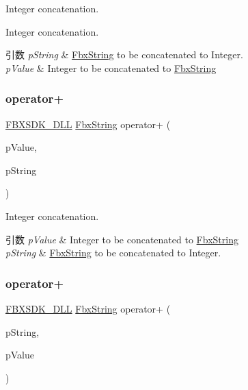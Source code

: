 Integer concatenation. 

Integer concatenation. 
\begin{DoxyParams}{引数}
{\em p\+String} & \hyperlink{class_fbx_string}{Fbx\+String} to be concatenated to Integer. \\
\hline
{\em p\+Value} & Integer to be concatenated to \hyperlink{class_fbx_string}{Fbx\+String} \\
\hline
\end{DoxyParams}
\mbox{\label{class_fbx_string_ac72b5d26f6740fac673665c33ae9ac7f}} 
\subsubsection{\texorpdfstring{operator+}{operator+}\hspace{0.1cm}{\footnotesize\ttfamily [7/10]}}
{\footnotesize\ttfamily \hyperlink{fbxarch_8h_a25d1298b33c31da5dbed969e0d4b4bc1}{F\+B\+X\+S\+D\+K\+\_\+\+D\+LL} \hyperlink{class_fbx_string}{Fbx\+String} operator+ (\begin{DoxyParamCaption}\item[{int}]{p\+Value,  }\item[{const \hyperlink{class_fbx_string}{Fbx\+String} \&}]{p\+String }\end{DoxyParamCaption})\hspace{0.3cm}{\ttfamily [friend]}}

Integer concatenation. 
\begin{DoxyParams}{引数}
{\em p\+Value} & Integer to be concatenated to \hyperlink{class_fbx_string}{Fbx\+String} \\
\hline
{\em p\+String} & \hyperlink{class_fbx_string}{Fbx\+String} to be concatenated to Integer. \\
\hline
\end{DoxyParams}
\mbox{\label{class_fbx_string_aac0e3ec29f0758f9359132067e1f9bf7}} 
\subsubsection{\texorpdfstring{operator+}{operator+}\hspace{0.1cm}{\footnotesize\ttfamily [8/10]}}
{\footnotesize\ttfamily \hyperlink{fbxarch_8h_a25d1298b33c31da5dbed969e0d4b4bc1}{F\+B\+X\+S\+D\+K\+\_\+\+D\+LL} \hyperlink{class_fbx_string}{Fbx\+String} operator+ (\begin{DoxyParamCaption}\item[{const \hyperlink{class_fbx_string}{Fbx\+String} \&}]{p\+String,  }\item[{float}]{p\+Value }\end{DoxyParamCaption})\hspace{0.3cm}{\ttfamily [friend]}}



